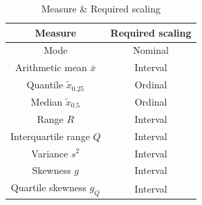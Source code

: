 \documentclass[12pt, a4paper, oneside]{ctexart}
\begin{document}
\begin{itemize}
    \begin{table}[!htbp]
        \centering
        \label{Measure}
        \caption{Measure \& Required scaling}
    \begin{tabular}{cc}
        \toprule  
        Measure& Required scaling\\
        \midrule  
        Mode& Nominal \\
        Arithmetic mean $\overline{x} $&Interval  \\
        Quantile $\widetilde{x}_{0.25}$&Ordinal  \\
        Median $\widetilde{x}_{0.5}$&Ordinal \\
        Range $R$&Interval  \\
        Interquartile range $Q$&Interval  \\
        Variance $s^2$&Interval \\
        Skewness $g$&Interval  \\
        Quartile skewness $g_Q$&Interval \\
        \bottomrule 
    \end{tabular}
    
    \end{table}
\end{itemize}
\end{document}
